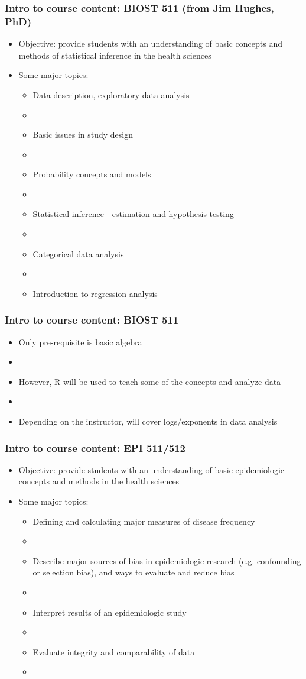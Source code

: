 \documentclass[12pt]{beamer}
\newcommand{\myframe}[1]{\begin{frame} \frametitle{#1}}
\begin{document}
\myframe{Intro to course content: BIOST 511 (from Jim Hughes, PhD)}
\begin{itemize}
\item Objective: provide students with an understanding of basic concepts and methods of statistical inference in the health sciences
\item Some major topics:
\begin{itemize}
\item Data description, exploratory data analysis
\item[]
\item Basic issues in study design
\item[]
\item Probability concepts and models
\item[]
\item Statistical inference - estimation and hypothesis testing
\item[]
\item Categorical data analysis
\item[]
\item Introduction to regression analysis
\end{itemize}
\end{itemize}
\end{frame}

\myframe{Intro to course content: BIOST 511}
\begin{itemize}
\item Only pre-requisite is basic algebra
\item[]
\item However, R will be used to teach some of the concepts and analyze data
\item[]
\item Depending on the instructor, will cover logs/exponents in data analysis
\end{itemize}
\end{frame}


\myframe{Intro to course content: EPI 511/512}
\begin{itemize}
\item Objective: provide students with an understanding of basic epidemiologic concepts and methods in the health sciences 
\item Some major topics:
\begin{itemize}
\item Defining and calculating major measures of disease frequency
\item[]
\item Describe major sources of bias in epidemiologic research (e.g. confounding or selection bias), and ways to evaluate and reduce bias
\item[]
\item Interpret results of an epidemiologic study
\item[]
\item Evaluate integrity and comparability of data
\item[]
\end{itemize}
\end{itemize}
\end{frame}
\end{document}
